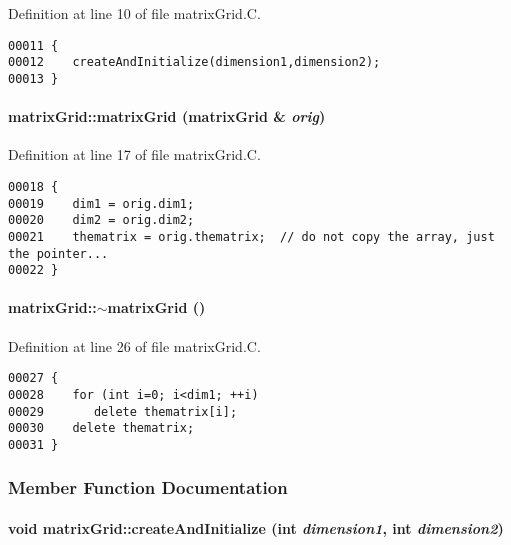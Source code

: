 Definition at line 10 of file matrix\-Grid.C.\small\begin{verbatim}00011 {
00012    createAndInitialize(dimension1,dimension2);
00013 }
\end{verbatim}\normalsize 
\label{matrixGrid_a1}
\paragraph{\setlength{\rightskip}{0pt plus 5cm}matrix\-Grid::matrix\-Grid (matrix\-Grid \& {\em orig})}\hfill



Definition at line 17 of file matrix\-Grid.C.\small\begin{verbatim}00018 {
00019    dim1 = orig.dim1;
00020    dim2 = orig.dim2;
00021    thematrix = orig.thematrix;  // do not copy the array, just the pointer...
00022 }
\end{verbatim}\normalsize 
\label{matrixGrid_a2}
\paragraph{\setlength{\rightskip}{0pt plus 5cm}matrix\-Grid::$\sim$matrix\-Grid ()}\hfill



Definition at line 26 of file matrix\-Grid.C.\small\begin{verbatim}00027 {
00028    for (int i=0; i<dim1; ++i)
00029       delete thematrix[i];
00030    delete thematrix; 
00031 }
\end{verbatim}\normalsize 


\subsubsection{Member Function Documentation}
\label{matrixGrid_c0}
\paragraph{\setlength{\rightskip}{0pt plus 5cm}void matrix\-Grid::create\-And\-Initialize (int {\em dimension1}, int {\em dimension2})\hspace{0.3cm}{\tt  [private]}}\hfill



